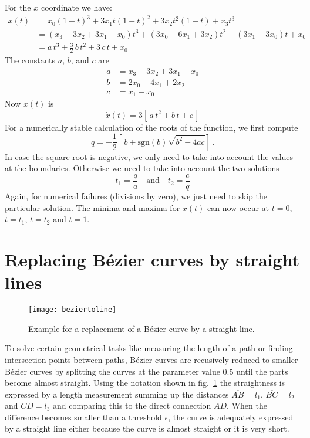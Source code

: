 \documentclass{article}
\begin{document}
For the $x$ coordinate we have:
\begin{align}
  x(t) & = x_0(1-t)^3 + 3x_1t(1-t)^2 + 3x_2t^2(1-t) + x_3 t^3\\
       & = (x_3-3x_2+3x_1-x_0)t^3 + (3x_0-6x_1+3x_2)t^2 + (3x_1-3x_0)t + x_0\\
       & = a\,t^3 + \frac{3}{2}\,b\,t^2 + 3\,c\,t + x_0
\end{align}
%
The constants $a$, $b$, and $c$ are
%
\begin{align}
  a & = x_3-3x_2+3x_1-x_0 \\
  b & = 2x_0-4x_1+2x_2 \\
  c & = x_1-x_0
\end{align}
%
Now $\dot x(t)$ is
%
\begin{equation}
  \dot x(t) = 3\left[\,a\,t^2 + b\,t + c\,\right]
\end{equation}
%
For a numerically stable calculation of the roots of the function, we
first compute
%
\begin{equation}
  q = -\frac{1}{2}\left[\,b+\mathrm{sgn}(b)\sqrt{b^2-4ac}\right]\, .
\end{equation}
%
In case the square root is negative, we only need to take into account
the values at the boundaries. Otherwise we need to take into account
the two solutions
%
\begin{equation}
  t_1 = \frac{q}{a} \quad\text{and}\quad t_2 = \frac{c}{q}
\end{equation}
%
Again, for numerical failures (divisions by zero), we just need to skip
the particular solution. The minima and maxima for $x(t)$ can now
occur at $t=0$, $t=t_1$, $t=t_2$ and $t=1$.


\section{Replacing B\'ezier curves by straight lines}

\begin{figure}
\centerline{\texttt{[image: beziertoline]}}
\caption{Example for a replacement of a B\'ezier curve by a straight
line.}
\label{fig:beziertoline}
\end{figure}

To solve certain geometrical tasks like measuring the length of a
path or finding intersection points between paths, B\'ezier curves
are recusively reduced to smaller B\'ezier curves by splitting the
curves at the parameter value 0.5 until the parts become almost
straight. Using the notation shown in fig.~\ref{fig:beziertoline} the
straightness is expressed by a length measurement summing up the
distances $\overline{AB}=l_1$, $\overline{BC}=l_2$ and
$\overline{CD}=l_3$ and comparing this to the direct connection
$\overline{AD}$. When the difference becomes smaller than a threshold
$\epsilon$, the curve is adequately expressed by a straight line
either because the curve is almost straight or it is very short.
\end{document}
